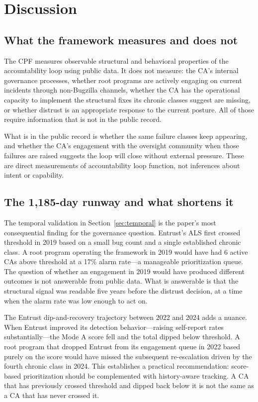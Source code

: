 \documentclass[10pt,twocolumn,letterpaper]{article}
\begin{document}
\section{Discussion}
\label{sec:discussion}

\subsection{What the framework measures and does not}

The CPF measures observable structural and behavioral properties of the accountability
loop using public data. It does not measure: the CA's internal governance processes,
whether root programs are actively engaging on current incidents through non-Bugzilla
channels, whether the CA has the operational capacity to implement the structural
fixes its chronic classes suggest are missing, or whether distrust is an appropriate
response to the current posture. All of those require information that is not in the
public record.

What is in the public record is whether the same failure classes keep appearing, and
whether the CA's engagement with the oversight community when those failures are raised
suggests the loop will close without external pressure. These are direct measurements
of accountability loop function, not inferences about intent or capability.

\subsection{The 1,185-day runway and what shortens it}

The temporal validation in Section~\ref{sec:temporal} is the paper's most consequential
finding for the governance question. Entrust's ALS first crossed threshold in 2019 based
on a small bug count and a single established chronic class. A root program operating the
framework in 2019 would have had 6 active CAs above threshold at a 17\% alarm rate---a
manageable prioritization queue. The question of whether an engagement in 2019 would have
produced different outcomes is not answerable from public data. What is answerable is that
the structural signal was readable five years before the distrust decision, at a time when
the alarm rate was low enough to act on.

The Entrust dip-and-recovery trajectory between 2022 and 2024 adds a nuance. When Entrust
improved its detection behavior---raising self-report rates substantially---the Mode A
score fell and the total dipped below threshold. A root program that dropped Entrust from
its engagement queue in 2022 based purely on the score would have missed the subsequent
re-escalation driven by the fourth chronic class in 2024. This establishes a practical
recommendation: score-based prioritization should be complemented with history-aware
tracking. A CA that has previously crossed threshold and dipped back below it is not the
same as a CA that has never crossed it.
\end{document}
